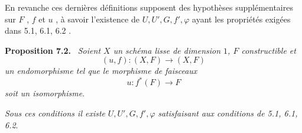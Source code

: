 \documentclass[11pt]{article}
\newenvironment{statement}[1]{\par\medskip\noindent\textbf{#1.}\ }{\par\medskip}
\begin{document}
En revanche ces dernières définitions supposent des hypothèses supplémentaires sur $F$ , $f$ et $u$ , à savoir l'existence de $U, U', G, f', \varphi$ ayant les propriétés exigées dans 5.1, 6.1, 6.2 .


\begin{statement}{Proposition 7.2}
\emph{Soient $X$ un schéma lisse de dimension $1$, $F$ constructible et}
\[
(u,f):(X,F)\longrightarrow (X,F)
\]
\emph{un endomorphisme tel que le morphisme de faisceaux}
\[
u:f^*(F)\longrightarrow F
\]
\emph{soit un isomorphisme}.

\emph{Sous ces conditions il existe} $U,U',G,f',\varphi$ \emph{satisfaisant aux conditions de 5.1, 6.1, 6.2}.
\end{statement}
\end{document}
